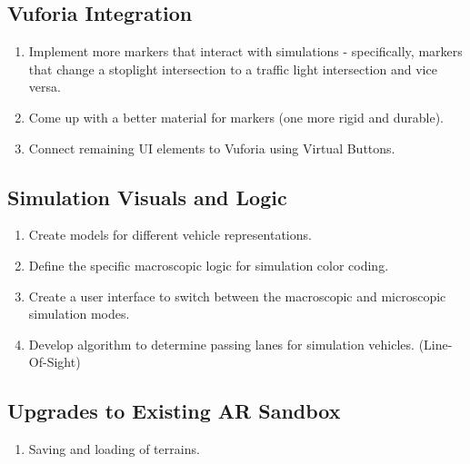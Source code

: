\documentclass[letterpaper, 10pt, onecolumn, draftclsnofoot]{IEEEtran}
\begin{document}
    \subsection{Vuforia Integration}
        \begin{enumerate}
            \item Implement more markers that interact with simulations - specifically, markers that change a stoplight intersection to a traffic light intersection and vice versa.
            \item Come up with a better material for markers (one more rigid and durable).
            \item Connect remaining UI elements to Vuforia using Virtual Buttons.
        \end{enumerate}
    
    \subsection{Simulation Visuals and Logic}
        \begin{enumerate}
            \item Create models for different vehicle representations.
            \item Define the specific macroscopic logic for simulation color coding.
            \item Create a user interface to switch between the macroscopic and microscopic simulation modes.
            \item Develop algorithm to determine passing lanes for simulation vehicles. (Line-Of-Sight)
        \end{enumerate}
        
    \subsection{Upgrades to Existing AR Sandbox}
        \begin{enumerate}
            \item Saving and loading of terrains.
        \end{enumerate}
        
\end{document}
